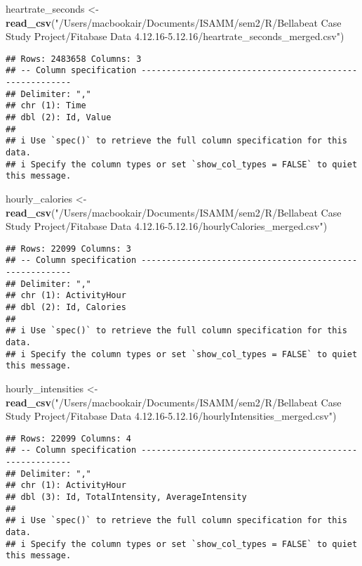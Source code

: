 \documentclass[
]{article}
\newenvironment{Shaded}{\begin{snugshade}}{\end{snugshade}}
\newcommand{\FunctionTok}[1]{\textcolor[rgb]{0.13,0.29,0.53}{\textbf{#1}}}
\newcommand{\NormalTok}[1]{#1}
\newcommand{\OtherTok}[1]{\textcolor[rgb]{0.56,0.35,0.01}{#1}}
\newcommand{\StringTok}[1]{\textcolor[rgb]{0.31,0.60,0.02}{#1}}
\begin{document}
\begin{Shaded}
\begin{Highlighting}[]
\NormalTok{heartrate\_seconds }\OtherTok{\textless{}{-}} \FunctionTok{read\_csv}\NormalTok{(}\StringTok{"/Users/macbookair/Documents/ISAMM/sem2/R/Bellabeat Case Study Project/Fitabase Data 4.12.16{-}5.12.16/heartrate\_seconds\_merged.csv"}\NormalTok{)}
\end{Highlighting}
\end{Shaded}

\begin{verbatim}
## Rows: 2483658 Columns: 3
## -- Column specification --------------------------------------------------------
## Delimiter: ","
## chr (1): Time
## dbl (2): Id, Value
## 
## i Use `spec()` to retrieve the full column specification for this data.
## i Specify the column types or set `show_col_types = FALSE` to quiet this message.
\end{verbatim}

\begin{Shaded}
\begin{Highlighting}[]
\NormalTok{hourly\_calories }\OtherTok{\textless{}{-}} \FunctionTok{read\_csv}\NormalTok{(}\StringTok{"/Users/macbookair/Documents/ISAMM/sem2/R/Bellabeat Case Study Project/Fitabase Data 4.12.16{-}5.12.16/hourlyCalories\_merged.csv"}\NormalTok{)}
\end{Highlighting}
\end{Shaded}

\begin{verbatim}
## Rows: 22099 Columns: 3
## -- Column specification --------------------------------------------------------
## Delimiter: ","
## chr (1): ActivityHour
## dbl (2): Id, Calories
## 
## i Use `spec()` to retrieve the full column specification for this data.
## i Specify the column types or set `show_col_types = FALSE` to quiet this message.
\end{verbatim}

\begin{Shaded}
\begin{Highlighting}[]
\NormalTok{hourly\_intensities }\OtherTok{\textless{}{-}} \FunctionTok{read\_csv}\NormalTok{(}\StringTok{"/Users/macbookair/Documents/ISAMM/sem2/R/Bellabeat Case Study Project/Fitabase Data 4.12.16{-}5.12.16/hourlyIntensities\_merged.csv"}\NormalTok{)}
\end{Highlighting}
\end{Shaded}

\begin{verbatim}
## Rows: 22099 Columns: 4
## -- Column specification --------------------------------------------------------
## Delimiter: ","
## chr (1): ActivityHour
## dbl (3): Id, TotalIntensity, AverageIntensity
## 
## i Use `spec()` to retrieve the full column specification for this data.
## i Specify the column types or set `show_col_types = FALSE` to quiet this message.
\end{verbatim}
\end{document}
